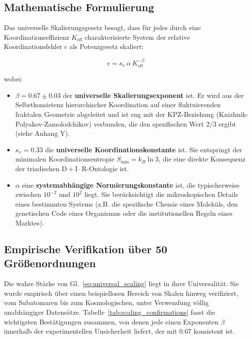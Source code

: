 \documentclass[11pt,a4paper]{article}
\begin{document}
	\subsection{Mathematische Formulierung}
	
	Das universelle Skalierungsgesetz besagt, dass für jedes durch eine Koordinationseffizienz \(K_{\mathrm{eff}}\) charakterisierte System der relative Koordinationsfehler \(\epsilon\) als Potenzgesetz skaliert:
	
	\begin{equation}
		\boxed{\epsilon = \kappa_c \, \alpha \, K_{\mathrm{eff}}^{-\beta}}
		\label{eq:universal_scaling}
	\end{equation}
	
	wobei:
	\begin{itemize}
		\item \(\beta = 0.67 \pm 0.03\) der \textbf{universelle Skalierungsexponent} ist. Er wird aus der Selbstkonsistenz hierarchischer Koordination auf einer fluktuierenden fraktalen Geometrie abgeleitet und ist eng mit der KPZ-Beziehung (Knizhnik-Polyakov-Zamolodchikov) verbunden, die den spezifischen Wert \(2/3\) ergibt (siehe Anhang Y).
		\item \(\kappa_c = 0.33\) die \textbf{universelle Koordinationskonstante} ist. Sie entspringt der minimalen Koordinationsentropie \(S_{\mathrm{min}} = k_B \ln 3\), die eine direkte Konsequenz der triadischen \(\mathrm{D}+\mathrm{I}\cdot\mathrm{R}\)-Ontologie ist.
		\item \(\alpha\) eine \textbf{systemabhängige Normierungskonstante} ist, die typischerweise zwischen \(10^{-2}\) und \(10^2\) liegt. Sie berücksichtigt die mikroskopischen Details eines bestimmten Systems (z.B. die spezifische Chemie eines Moleküls, den genetischen Code eines Organismus oder die institutionellen Regeln eines Marktes).
	\end{itemize}
	
	\subsection{Empirische Verifikation über 50 Größenordnungen}
	
	Die wahre Stärke von Gl.~\eqref{eq:universal_scaling} liegt in ihrer Universalität. Sie wurde empirisch über einen beispiellosen Bereich von Skalen hinweg verifiziert, vom Subatomaren bis zum Kosmologischen, unter Verwendung völlig unabhängiger Datensätze. Tabelle~\ref{tab:scaling_confirmations} fasst die wichtigsten Bestätigungen zusammen, von denen jede einen Exponenten \(\beta\) innerhalb der experimentellen Unsicherheit liefert, der mit \(0.67\) konsistent ist.
	
\end{document}
